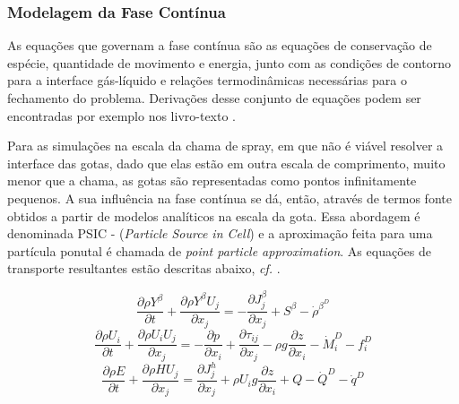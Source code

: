 



\subsubsection{Modelagem da Fase Contínua} \label{sec:gas}

As equações que governam a fase contínua são as equações de conservação de espécie, quantidade de movimento e energia, junto com as condições de contorno para a interface gás-líquido e relações termodinâmicas necessárias para o fechamento do problema.
Derivações desse conjunto de equações podem ser encontradas por exemplo nos livro-texto \cite{Williams1985,Kuo2005,Law2006}.

Para as simulações na escala da chama de spray, em que não é viável resolver a interface das gotas, dado que elas estão em outra escala de comprimento, muito menor que a chama, as gotas são representadas como pontos infinitamente pequenos.
A sua influência na fase contínua se dá, então, através de termos fonte obtidos a partir de modelos analíticos na escala da gota. 
Essa abordagem é denominada PSIC - (\emph{Particle Source in Cell}) e a aproximação feita para uma partícula ponutal é chamada de \emph{point particle approximation}.
As equações de transporte resultantes estão descritas abaixo, \emph{cf.} \cite{JennyB2012}.

\begin{equation}
    \frac{\partial \rho Y^\beta}{\partial t} + 
    \frac{\partial \rho Y^\beta U_j}{\partial x_j} =
    - \frac{\partial J_j^\beta}{\partial x_j} +
    S^\beta -
    \dot \rho^{\beta^D}
\end{equation}
\begin{equation}
    \frac{\partial \rho U_i}{\partial t} + 
    \frac{\partial \rho U_i U_j}{\partial x_j} =
    - \frac{\partial p}{\partial x_i} +
    \frac{\partial \tau_{ij}}{\partial x_j} -
    \rho g\frac{\partial z}{\partial x_i} -
    \dot M_i^D -
    f_i^D
\end{equation}
\begin{equation}
    \frac{\partial \rho E}{\partial t} + 
    \frac{\partial \rho H U_j}{\partial x_j} =
    \frac{\partial J_j^h}{\partial x_j} +
    \rho U_i g \frac{\partial z}{\partial x_i} +
    Q -
    \dot Q^D -
    \dot q^D
\end{equation}


